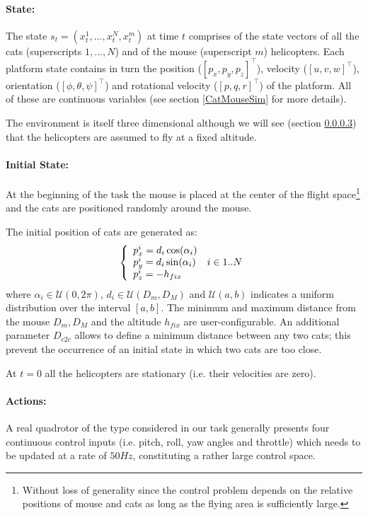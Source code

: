 \documentclass[a4paper,11pt]{report}
\begin{document}
\paragraph{State:} The state $s_t = (x^1_t,...,x^{N}_t,x^m_t)$ at time $t$ comprises of the state vectors of all the cats (superscripts $1,...,N$) and of the mouse (superscript $m$) helicopters. 
Each platform state contains in turn the position ($[p_x,p_y,p_z]^\intercal$), velocity ($[u,v,w]^\intercal$), orientation ($[\phi,\theta,\psi]^\intercal$) and rotational velocity ($[p,q,r]^\intercal$) of the platform. All of these are continuous variables (see section \ref{CatMouseSim} for more details).

The environment is itself three dimensional although we will see (section \ref{catmouseactions}) that the helicopters are assumed to fly at a fixed altitude.

\paragraph{Initial State:} At the beginning of the task the mouse is placed at the center of the flight space\footnote{Without loss of generality since the control problem depends on the relative positions of mouse and cats as long as the flying area is sufficiently large.} and the cats are positioned randomly around the mouse.

The initial position of cats are generated as:
$$
\left\{
\begin{array}{l l}
p^i_x =  d_i \cos(\alpha_i) & \\
p^i_y =  d_i \sin(\alpha_i) & i \in 1..N\\
p^i_z = - h_{fix} & \\
\end{array}
\right.
$$
where $\alpha_i \in \mathcal{U}(0,2\pi)$, $d_i \in \mathcal{U}(D_m,D_M)$ and $\mathcal{U}(a,b)$ indicates a uniform distribution over the interval $[a,b]$. The minimum and maximum distance from the mouse $D_m,D_M$ and the altitude $h_{fix}$ are user-configurable.
An additional parameter $D_{c2c}$ allows to define a minimum distance between any two cats; this prevent the occurrence of an initial state in which two cats are too close.

At $t=0$ all the helicopters are stationary (i.e. their velocities are zero).

\paragraph{Actions:}\label{catmouseactions} 
A real quadrotor of the type considered in our task generally presents four continuous control inputs (i.e. pitch, roll, yaw angles and throttle) which needs to be updated at a rate of $50Hz$, constituting a rather large control space.
\end{document}
